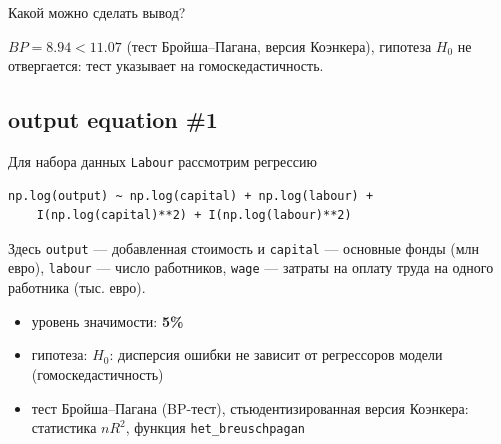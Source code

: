 \documentclass[
  russian,
]{article}
\providecommand{\tightlist}{%
  \setlength{\itemsep}{0pt}\setlength{\parskip}{0pt}}
\begin{document}
Какой можно сделать вывод?

\begin{tcolorbox}[enhanced jigsaw, arc=.35mm, bottomrule=.15mm, bottomtitle=1mm, breakable, colback=white, colbacktitle=quarto-callout-tip-color!10!white, colframe=quarto-callout-tip-color-frame, coltitle=black, left=2mm, leftrule=.75mm, opacityback=0, opacitybacktitle=0.6, rightrule=.15mm, title=\textcolor{quarto-callout-tip-color}{\faLightbulb}\hspace{0.5em}{Вывод}, titlerule=0mm, toprule=.15mm, toptitle=1mm]

\(BP = 8.94 < 11.07\) (тест Бройша--Пагана, версия Коэнкера), гипотеза
\(H_0\) не отвергается: тест указывает на гомоскедастичность.

\end{tcolorbox}

\subsection{output equation \#1}\label{output-equation-1}

Для набора данных \texttt{Labour} рассмотрим регрессию

\begin{verbatim}
np.log(output) ~ np.log(capital) + np.log(labour) +
    I(np.log(capital)**2) + I(np.log(labour)**2)
\end{verbatim}

Здесь \texttt{output} --- добавленная стоимость и \texttt{capital} ---
основные фонды (млн евро), \texttt{labour} --- число работников,
\texttt{wage} --- затраты на оплату труда на одного работника (тыс.
евро).

\begin{tcolorbox}[enhanced jigsaw, arc=.35mm, bottomrule=.15mm, bottomtitle=1mm, breakable, colback=white, colbacktitle=quarto-callout-important-color!10!white, colframe=quarto-callout-important-color-frame, coltitle=black, left=2mm, leftrule=.75mm, opacityback=0, opacitybacktitle=0.6, rightrule=.15mm, title=\textcolor{quarto-callout-important-color}{\faExclamation}\hspace{0.5em}{Условия теста}, titlerule=0mm, toprule=.15mm, toptitle=1mm]

\begin{itemize}
\tightlist
\item
  уровень значимости: \textbf{5\%}
\item
  гипотеза: \(H_0\): дисперсия ошибки не зависит от регрессоров модели
  (гомоскедастичность)
\item
  тест Бройша--Пагана (BP-тест), стьюдентизированная версия Коэнкера:
  статистика \(nR^2\), функция \texttt{het\_breuschpagan}
\end{itemize}

\end{tcolorbox}
\end{document}
